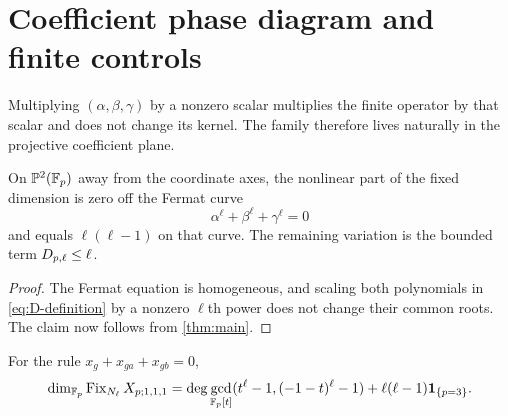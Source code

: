 \section{Coefficient phase diagram and finite controls}

Multiplying $(\alpha,\beta,\gamma)$ by a nonzero scalar multiplies the finite
operator by that scalar and does not change its kernel.  The family therefore
lives naturally in the projective coefficient plane.

\begin{corollary}\label{cor:phase-diagram}
On $\mathbb P^2(\mathbb F_p)$ away from the coordinate axes, the nonlinear part of
the fixed dimension is zero off the Fermat curve
\[
 \alpha^\ell+\beta^\ell+\gamma^\ell=0
\]
and equals $\ell(\ell-1)$ on that curve.  The remaining variation is the
bounded term $D_{p,\ell}\le\ell$.
\end{corollary}

\begin{proof}
The Fermat equation is homogeneous, and scaling both polynomials in
\eqref{eq:D-definition} by a nonzero $\ell$th power does not change their
common roots.  The claim now follows from \cref{thm:main}.
\end{proof}

\begin{center}
\end{center}

\begin{corollary}\label{cor:unit}
For the rule $x_g+x_{ga}+x_{gb}=0$,
\[
 \dim_{\mathbb F_p}\operatorname{Fix}_{N_\ell}X_{p;1,1,1}
 =\deg\gcd_{\mathbb F_p[t]}(t^\ell-1,(-1-t)^\ell-1)
  +\ell(\ell-1)\mathbf 1_{\{p=3\}}.
\]
\end{corollary}

